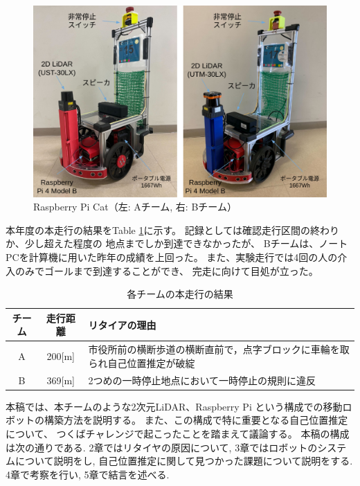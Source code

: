 \documentclass[twocolumn,9pt]{jsproceedings}
\begin{document}
\begin{figure}[h]
 	\begin{center}
 		\includegraphics[width=1.0\linewidth]{figs/raspicat.pdf}
 		\caption{Raspberry Pi Cat（左: Aチーム, 右: Bチーム）}
 		\label{fig:raspicat}
 	\end{center}
\end{figure}

本年度の本走行の結果をTable \ref{MainRun}に示す。
記録としては確認走行区間の終わりか、少し超えた程度の
地点までしか到達できなかったが、
Bチームは、ノートPCを計算機に用いた昨年の成績を上回った。
また、実験走行では4回の人の介入のみでゴールまで到達することができ、
完走に向けて目処が立った。

\begin{table}[h]
  \caption{各チームの本走行の結果}
  \label{MainRun}
	\begin{tabular}{|c|c|p{5.4cm}|}
    \hline
	チーム & 走行距離 & リタイアの理由 \\
    \hline
	A & 200[m] & 市役所前の横断歩道の横断直前で，点字ブロックに車輪を取られ自己位置推定が破綻\\
    \hline
	B & 369[m] & 2つめの一時停止地点において一時停止の規則に違反 \\ 
    \hline
  \end{tabular}
\end{table}


本稿では、本チームのような2次元LiDAR、Raspberry Pi
という構成での移動ロボットの構築方法を説明する。
また、この構成で特に重要となる自己位置推定について、
つくばチャレンジで起こったことを踏まえて議論する。
本稿の構成は次の通りである. 
2章ではリタイヤの原因について, 
3章ではロボットのシステムについて説明をし, 
自己位置推定に関して見つかった課題について説明をする. 
4章で考察を行い, 5章で結言を述べる. 
\end{document}
